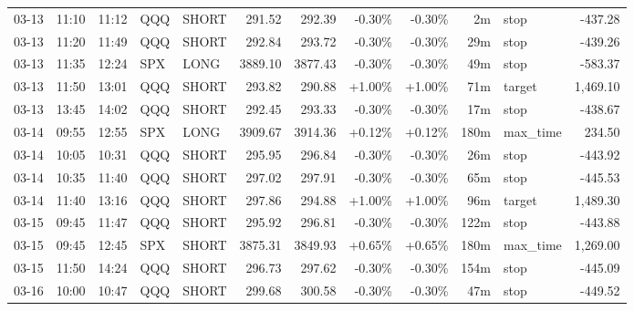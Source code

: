 \documentclass[11pt,a4paper,twoside]{article}
\begin{document}
\begin{center}
\begin{longtable}{>{\color{txtmain}}l l l l l r r r r r >{\color{txtmain}}l r}
03-13 & 11:10 & 11:12 & QQQ & SHORT & 291.52 & 292.39 & \textcolor{lossred}{-0.30\%} & \textcolor{lossred}{-0.30\%} & 2m & stop & \textcolor{lossred}{-437.28} \\
03-13 & 11:20 & 11:49 & QQQ & SHORT & 292.84 & 293.72 & \textcolor{lossred}{-0.30\%} & \textcolor{lossred}{-0.30\%} & 29m & stop & \textcolor{lossred}{-439.26} \\
03-13 & 11:35 & 12:24 & SPX & LONG & 3889.10 & 3877.43 & \textcolor{lossred}{-0.30\%} & \textcolor{lossred}{-0.30\%} & 49m & stop & \textcolor{lossred}{-583.37} \\
03-13 & 11:50 & 13:01 & QQQ & SHORT & 293.82 & 290.88 & \textcolor{wingreen}{+1.00\%} & \textcolor{wingreen}{+1.00\%} & 71m & target & \textcolor{wingreen}{1,469.10} \\
03-13 & 13:45 & 14:02 & QQQ & SHORT & 292.45 & 293.33 & \textcolor{lossred}{-0.30\%} & \textcolor{lossred}{-0.30\%} & 17m & stop & \textcolor{lossred}{-438.67} \\
03-14 & 09:55 & 12:55 & SPX & LONG & 3909.67 & 3914.36 & \textcolor{wingreen}{+0.12\%} & \textcolor{wingreen}{+0.12\%} & 180m & max\_time & \textcolor{wingreen}{234.50} \\
03-14 & 10:05 & 10:31 & QQQ & SHORT & 295.95 & 296.84 & \textcolor{lossred}{-0.30\%} & \textcolor{lossred}{-0.30\%} & 26m & stop & \textcolor{lossred}{-443.92} \\
03-14 & 10:35 & 11:40 & QQQ & SHORT & 297.02 & 297.91 & \textcolor{lossred}{-0.30\%} & \textcolor{lossred}{-0.30\%} & 65m & stop & \textcolor{lossred}{-445.53} \\
03-14 & 11:40 & 13:16 & QQQ & SHORT & 297.86 & 294.88 & \textcolor{wingreen}{+1.00\%} & \textcolor{wingreen}{+1.00\%} & 96m & target & \textcolor{wingreen}{1,489.30} \\
03-15 & 09:45 & 11:47 & QQQ & SHORT & 295.92 & 296.81 & \textcolor{lossred}{-0.30\%} & \textcolor{lossred}{-0.30\%} & 122m & stop & \textcolor{lossred}{-443.88} \\
03-15 & 09:45 & 12:45 & SPX & SHORT & 3875.31 & 3849.93 & \textcolor{wingreen}{+0.65\%} & \textcolor{wingreen}{+0.65\%} & 180m & max\_time & \textcolor{wingreen}{1,269.00} \\
03-15 & 11:50 & 14:24 & QQQ & SHORT & 296.73 & 297.62 & \textcolor{lossred}{-0.30\%} & \textcolor{lossred}{-0.30\%} & 154m & stop & \textcolor{lossred}{-445.09} \\
03-16 & 10:00 & 10:47 & QQQ & SHORT & 299.68 & 300.58 & \textcolor{lossred}{-0.30\%} & \textcolor{lossred}{-0.30\%} & 47m & stop & \textcolor{lossred}{-449.52} \\

\end{longtable}
\end{center}
\end{document}
